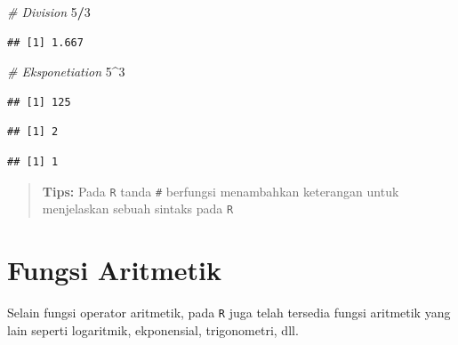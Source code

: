 \documentclass[]{book}
\newenvironment{Shaded}{\begin{snugshade}}{\end{snugshade}}
\newcommand{\CommentTok}[1]{\textcolor[rgb]{0.56,0.35,0.01}{\textit{#1}}}
\newcommand{\DecValTok}[1]{\textcolor[rgb]{0.00,0.00,0.81}{#1}}
\newcommand{\OperatorTok}[1]{\textcolor[rgb]{0.81,0.36,0.00}{\textbf{#1}}}
\theoremstyle{definition}
\theoremstyle{definition}
\theoremstyle{definition}
\theoremstyle{remark}
\begin{document}
\begin{Shaded}
\begin{Highlighting}[]
\CommentTok{# Division}
\DecValTok{5}\OperatorTok{/}\DecValTok{3}
\end{Highlighting}
\end{Shaded}

\begin{verbatim}
## [1] 1.667
\end{verbatim}

\begin{Shaded}
\begin{Highlighting}[]
\CommentTok{# Eksponetiation}
\DecValTok{5}\OperatorTok{^}\DecValTok{3}
\end{Highlighting}
\end{Shaded}

\begin{verbatim}
## [1] 125
\end{verbatim}

\begin{Shaded}
\end{Shaded}

\begin{verbatim}
## [1] 2
\end{verbatim}

\begin{Shaded}
\end{Shaded}

\begin{verbatim}
## [1] 1
\end{verbatim}

\begin{quote}
\textbf{Tips:} Pada \texttt{R} tanda \texttt{\#} berfungsi menambahkan keterangan untuk menjelaskan sebuah sintaks pada \texttt{R}
\end{quote}

\hypertarget{aritmaticfunction}{%
\section{Fungsi Aritmetik}\label{aritmaticfunction}}

Selain fungsi operator aritmetik, pada \texttt{R} juga telah tersedia fungsi aritmetik yang lain seperti logaritmik, ekponensial, trigonometri, dll.
\end{document}
